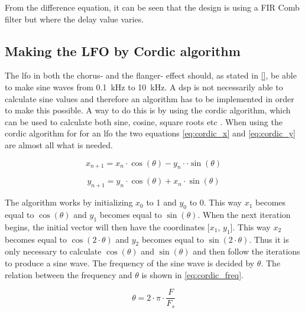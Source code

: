 From the difference equation, it can be seen that the design is using a FIR Comb filter but where the delay value varies. 

\subsection{Making the LFO by Cordic algorithm}
The \gls{lfo} in both the chorus- and the flanger- effect should, as stated in \autoref{}, be able to make sine waves from \SI{0.1}{\kilo\hertz} to \SI{10}{\kilo\hertz}. A \gls{dsp} is not necessarily able to calculate sine values and therefore an algorithm has to be implemented in order to make this possible. A way to do this is by using the \gls{cordic} algorithm, which can be used to calculate both sine, cosine, square roots etc \citep{cordic}. 
When using the \gls{cordic} algorithm for for an \gls{lfo} the two equations \autoref{eq:cordic_x} and \autoref{eq:cordic_y} are almost all what is needed.

\begin{equation}
\label{eq:cordic_x}
		x_{n+1} = x_n \cdot \cos(\theta) - y_n \cdot \cdot \sin(\theta) 
\end{equation}
\startexplain
    \stopexplain 

\begin{equation}
\label{eq:cordic_y}
		y_{n+1} = y_n \cdot \cos(\theta) + x_n \cdot \sin(\theta) 
\end{equation}
\startexplain
\stopexplain

The algorithm works by initializing $x_0$ to 1 and $y_0$ to 0. This way $x_1$ becomes equal to $\cos(\theta)$ and $y_1$ becomes equal to $\sin(\theta)$. When the next iteration begins, the initial vector will then have the coordinates [$x_1$, $y_1$]. This way $x_2$ becomes equal to $\cos(2 \cdot \theta)$ and $y_2$ becomes equal to $\sin(2 \cdot \theta)$. Thus it is only necessary to calculate $\cos(\theta)$ and $\sin(\theta)$ and then follow the iterations to produce a sine wave. The frequency of the sine wave is decided by $\theta$. The relation between the frequency and $\theta$ is shown in \autoref{eq:cordic_freq}.

\begin{equation}
\label{eq:cordic_freq}
		\theta = 2 \cdot \pi \cdot \frac{F}{F_s} 
\end{equation}
\startexplain
\stopexplain 

